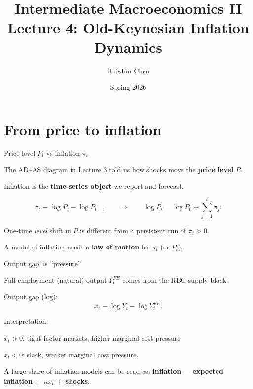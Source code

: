 \documentclass[aspectratio=169,xcolor=dvipsnames]{beamer}
\title[Lecture 4: Inflation Dynamics]{Intermediate Macroeconomics II\\\vspace{4pt}Lecture 4: Old-Keynesian Inflation Dynamics}
\author[Hui-Jun Chen]{Hui-Jun Chen}
\institute[]{National Tsing Hua University}
\date{Spring 2026}
\let\tempone\itemize
\let\temptwo\enditemize
\renewenvironment{itemize}{\tempone\addtolength{\itemsep}{\fill}}{\temptwo}
\begin{document}
\begin{frame}
    \titlepage
\end{frame}

\section[Inflation]{From price to inflation}

\begin{frame}{Price level $P_t$ vs inflation $\pi_t$}
\small
\begin{itemize}
\item The AD--AS diagram in Lecture 3 told us how shocks move the \textbf{price level} $P$.
\item Inflation is the \textbf{time-series object} we report and forecast.
\end{itemize}

\vspace{0.4em}
\[
\pi_t \equiv \log P_t - \log P_{t-1}
\qquad \Rightarrow \qquad
\log P_t = \log P_0 + \sum_{j=1}^{t}\pi_j.
\]

\vspace{0.4em}
\begin{itemize}
\item One-time \emph{level} shift in $P$ is different from a persistent run of $\pi_t>0$.
\item A model of inflation needs a \textbf{law of motion} for $\pi_t$ (or $P_t$).
\end{itemize}
\end{frame}

\begin{frame}{Output gap as ``pressure''}
\small
\begin{itemize}
\item Full-employment (natural) output $Y_t^{FE}$ comes from the RBC supply block.
\item Output gap (log):
\[
 x_t \equiv \log Y_t - \log Y_t^{FE}.
\]
\item Interpretation:
\begin{itemize}
\item $x_t>0$: tight factor markets, higher marginal cost pressure.
\item $x_t<0$: slack, weaker marginal cost pressure.
\end{itemize}
\end{itemize}

\vspace{0.3em}
\small
A large share of inflation models can be read as: \textbf{inflation = expected inflation + $\kappa x_t$ + shocks}.
\end{frame}
\end{document}
